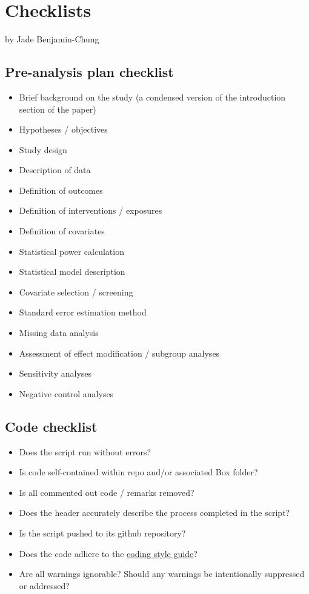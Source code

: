 \documentclass[
]{book}
\providecommand{\tightlist}{%
  \setlength{\itemsep}{0pt}\setlength{\parskip}{0pt}}
\begin{document}
\hypertarget{checklists}{%
\chapter{Checklists}\label{checklists}}

by Jade Benjamin-Chung

\hypertarget{pre-analysis-plan-checklist}{%
\section{Pre-analysis plan checklist}\label{pre-analysis-plan-checklist}}

\begin{itemize}
\tightlist
\item
  Brief background on the study (a condensed version of the introduction section of the paper)
\item
  Hypotheses / objectives
\item
  Study design
\item
  Description of data
\item
  Definition of outcomes
\item
  Definition of interventions / exposures
\item
  Definition of covariates
\item
  Statistical power calculation
\item
  Statistical model description
\item
  Covariate selection / screening
\item
  Standard error estimation method
\item
  Missing data analysis
\item
  Assessment of effect modification / subgroup analyses
\item
  Sensitivity analyses
\item
  Negative control analyses
\end{itemize}

\hypertarget{code-checklist}{%
\section{Code checklist}\label{code-checklist}}

\begin{itemize}
\tightlist
\item
  Does the script run without errors?
\item
  Is code self-contained within repo and/or associated Box folder?
\item
  Is all commented out code / remarks removed?
\item
  Does the header accurately describe the process completed in the script?
\item
  Is the script pushed to its github repository?
\item
  Does the code adhere to the \href{https://jadebc.github.io/lab-manual/coding-style.html}{coding style guide}?
\item
  Are all warnings ignorable? Should any warnings be intentionally suppressed or addressed?
\end{itemize}
\end{document}
